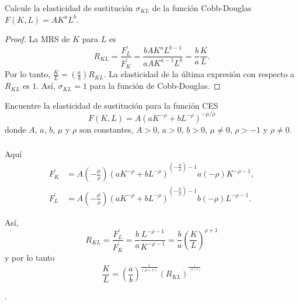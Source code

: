 \begin{frame}[t]
\frametitle{\secname}
\begin{example}
Calcule la elasticidad de sustitución $\sigma_{KL}$ de la función Cobb-Douglas $F\left(K,L\right)=AK^{a}L^{b}$.
\end{example}

\begin{proof}
La \textsc{MRS} de $K$ para $L$ es \[ R_{KL}=\frac{F^{\prime}_{L}}{F^{\prime}_{K}}=\frac{bAK^{a}L^{b-1}}{aAK^{a-1}L^{b}}=\frac{b}{a}\frac{K}{L}. \] Por lo tanto, $\frac{K}{L}=\left(\frac{a}{b}\right)R_{KL}$. La elasticidad de la última expresión con respecto a $R_{KL}$ es $1$. Así, $\sigma_{KL}=1$ para la función de Cobb-Douglas.
\end{proof}

\begin{example}
Encuentre la elasticidad de sustitución para la función \textsc{CES} \[ F\left(K,L\right)=A{\left(aK^{-\rho}+bL^{-\rho}\right)}^{-\mu/\rho} \] donde $A$, $a$, $b$, $\mu$ y $\rho$ son constantes, $A>0$, $a>0$, $b>0$, $\mu\neq0$, $\rho>-1$ y $\rho\neq0$.
\end{example}

\end{frame}

\begin{frame}[t]
\frametitle{\secname}
\begin{proofs}
Aquí
\begin{align*}
F^{\prime}_{K}&=A{\left(-\frac{\mu}{\rho}\right)\left(aK^{-\rho}+bL^{-\rho}\right)}^{\left(-\frac{\mu}{\rho}\right)-1}a\left(-\rho\right)K^{-\rho-1},\\
F^{\prime}_{L}&=A{\left(-\frac{\mu}{\rho}\right)\left(aK^{-\rho}+bL^{-\rho}\right)}^{\left(-\frac{\mu}{\rho}\right)-1}b\left(-\rho\right)L^{-\rho-1}.
\end{align*}

Así, \[ R_{KL}=\frac{F^{\prime}_{L}}{F^{\prime}_{K}}=\frac{b}{a}\frac{L^{-\rho-1}}{K^{-\rho-1}}=\frac{b}{a}{\left(\frac{K}{L}\right)}^{\rho+1} \] y por lo tanto \[ \frac{K}{L}={\left(\frac{a}{b}\right)}^{\frac{1}{\left(\rho+1\right)}}{\left(R_{KL}\right)}^{^{\frac{1}{\left(\rho+1\right)}}} \]
\end{proofs}.
\end{frame}

